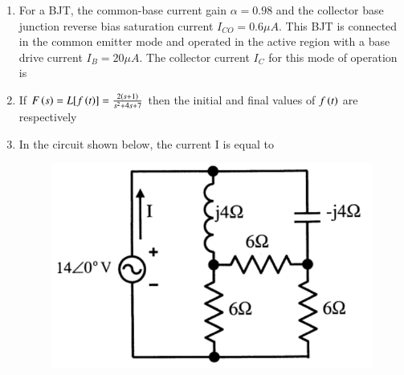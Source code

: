 \documentclass[a4paper, 11pt]{article}
\begin{document}
\begin{enumerate}
    \hfill{}

    \item For a BJT, the common-base current gain $\alpha=0.98$ and the collector base junction reverse bias saturation current $I_{CO}=0.6 \mu A$. This BJT is connected in the common emitter mode and operated in the active region with a base drive current $I_{B}=20 \mu A$. The collector current $I_{C}$ for this mode of operation is
    
    \begin{enumerate}
    \end{enumerate}

    \hfill{}

    \item If $F\left(s\right)=L[f\left(t\right)]=\frac{2\left(s+1\right)}{s^{2}+4s+7}$ then the initial and final values of $f\left(t\right)$ are respectively
    
    \begin{enumerate}
    \end{enumerate}
    
    \hfill{}

    \item In the circuit shown below, the current I is equal to
    
    \begin{figure}[H]
        \centering
        \includegraphics[width=0.4\columnwidth]{figs/q46.png}
        \caption*{}
        \label{fig:q46}
    \end{figure}
    

\end{enumerate}
\end{document}
